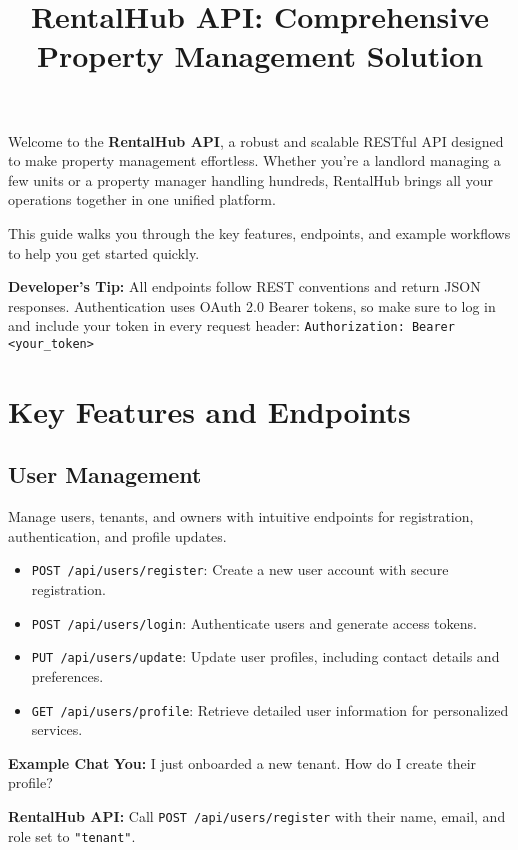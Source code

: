 \documentclass[11pt]{article}
\title{\textbf{\color{sectionblue}RentalHub API: Comprehensive Property Management Solution}}
\date{}
\begin{document}
\maketitle

\noindent
Welcome to the \textbf{RentalHub API}, a robust and scalable RESTful API designed to make property management effortless. Whether you're a landlord managing a few units or a property manager handling hundreds, RentalHub brings all your operations together in one unified platform.  

This guide walks you through the key features, endpoints, and example workflows to help you get started quickly.  

\begin{tipbox}
\noindent
\textbf{Developer's Tip:} All endpoints follow REST conventions and return JSON responses.  
Authentication uses OAuth 2.0 Bearer tokens, so make sure to log in and include your token in every request header:  
\texttt{Authorization: Bearer <your\_token>}
\end{tipbox}

\section{Key Features and Endpoints}

\subsection{User Management}
Manage users, tenants, and owners with intuitive endpoints for registration, authentication, and profile updates.

\begin{itemize}[leftmargin=*]
  \item \texttt{POST /api/users/register}: Create a new user account with secure registration.
  \item \texttt{POST /api/users/login}: Authenticate users and generate access tokens.
  \item \texttt{PUT /api/users/update}: Update user profiles, including contact details and preferences.
  \item \texttt{GET /api/users/profile}: Retrieve detailed user information for personalized services.
\end{itemize}

\begin{chatbox}
\noindent
\textbf{Example Chat}  
\textbf{You:} I just onboarded a new tenant. How do I create their profile?  

\textbf{RentalHub API:} Call \texttt{POST /api/users/register} with their name, email, and role set to \texttt{"tenant"}.
\end{chatbox}
\end{document}
